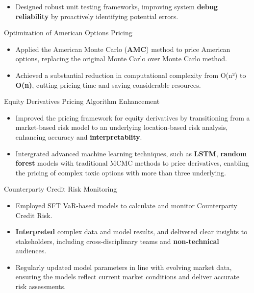 \begin{cventries}
{\begin{cvitems}
\begin{itemize}
          \item Designed robust unit testing frameworks, improving system \textbf{debug reliability} by proactively identifying potential errors.
        \end{itemize}
        \item Optimization of American Options Pricing
        \begin{itemize}
          \item Applied the American Monte Carlo (\textbf{AMC}) method to price American options, replacing the original Monte Carlo over Monte Carlo method. 
          \item Achieved a substantial reduction in computational complexity from O(n²) to \textbf{O(n)}, cutting pricing time and saving considerable resources.
        \end{itemize}
        \item Equity Derivatives Pricing Algorithm Enhancement
        \begin{itemize}
          \item Improved the pricing framework for equity derivatives by transitioning from a market-based risk model to an underlying location-based risk analysis, enhancing accuracy and \textbf{interpretablity}.
          \item Intergrated advanced machine learning techniques, such as \textbf{LSTM}, \textbf{random forest} models with traditional MCMC methods to price derivatives, enabling the pricing of complex toxic options with more than three underlying.
        \end{itemize}
        \item Counterparty Credit Risk Monitoring
        \begin{itemize}
          \item Employed SFT VaR-based models to calculate and monitor Counterparty Credit Risk.
          \item \textbf{Interpreted} complex data and model results, and delivered clear insights to stakeholders, including cross-disciplinary teams and \textbf{non-technical} audiences.
          \item Regularly updated model parameters in line with evolving market data, ensuring the models reflect current market conditions and deliver accurate risk assessments.
        \end{itemize}
      \end{cvitems}
    }



\end{cventries}
